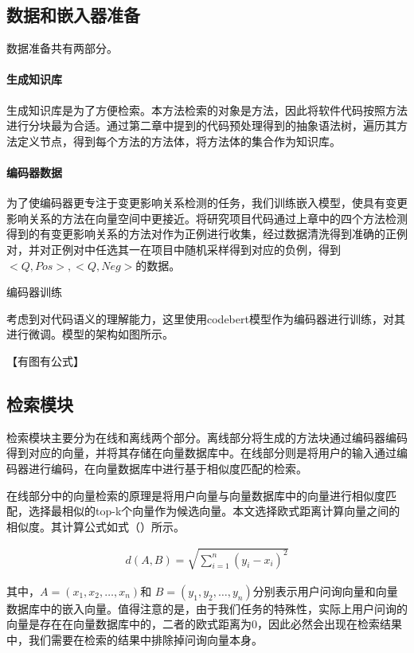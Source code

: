 \subsection{数据和嵌入器准备}

数据准备共有两部分。

\paragraph{生成知识库} 生成知识库是为了方便检索。本方法检索的对象是方法，因此将软件代码按照方法进行分块最为合适。通过第二章中提到的代码预处理得到的抽象语法树，遍历其方法定义节点，得到每个方法的方法体，将方法体的集合作为知识库。

\paragraph{编码器数据} 为了使编码器更专注于变更影响关系检测的任务，我们训练嵌入模型，使具有变更影响关系的方法在向量空间中更接近。将研究项目代码通过上章中的四个方法检测得到的有变更影响关系的方法对作为正例进行收集，经过数据清洗得到准确的正例对，并对正例对中任选其一在项目中随机采样得到对应的负例，得到$<Q,Pos>,<Q,Neg>$的数据。


编码器训练

考虑到对代码语义的理解能力，这里使用codebert模型作为编码器进行训练，对其进行微调。模型的架构如图所示。

【有图有公式】


\subsection{检索模块}

检索模块主要分为在线和离线两个部分。离线部分将生成的方法块通过编码器编码得到对应的向量，并将其存储在向量数据库中。在线部分则是将用户的输入通过编码器进行编码，在向量数据库中进行基于相似度匹配的检索。


在线部分中的向量检索的原理是将用户向量与向量数据库中的向量进行相似度匹配，选择最相似的top-k个向量作为候选向量。本文选择欧式距离计算向量之间的相似度。其计算公式如式（）所示。


\begin{align}
d(A, B) = \sqrt{\sum_{i=1}^{n} (y_i - x_i)^2}
\end{align}

其中，$A = (x_1, x_2, \dots, x_n)$和 $ B = (y_1, y_2, \dots, y_n)$分别表示用户问询向量和向量数据库中的嵌入向量。值得注意的是，由于我们任务的特殊性，实际上用户问询的向量是存在在向量数据库中的，二者的欧式距离为0，因此必然会出现在检索结果中，我们需要在检索的结果中排除掉问询向量本身。



